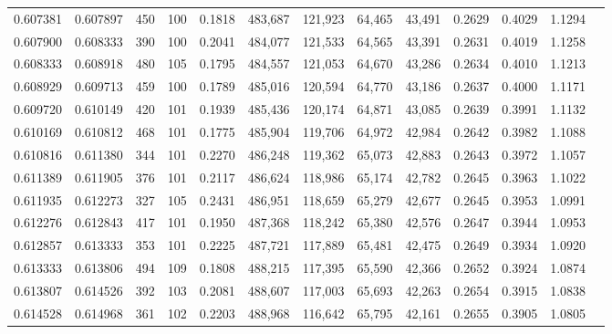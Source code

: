 \begin{tabular}{rrrrrrrrrrrrr}
0.607381 & 0.607897 &    450 &   100 &                                     0.1818 & 483,687 & 121,923 &  64,465 &  43,491 & 0.2629 & 0.4029 & 1.1294 \\
0.607900 & 0.608333 &    390 &   100 &                                     0.2041 & 484,077 & 121,533 &  64,565 &  43,391 & 0.2631 & 0.4019 & 1.1258 \\
0.608333 & 0.608918 &    480 &   105 &                                     0.1795 & 484,557 & 121,053 &  64,670 &  43,286 & 0.2634 & 0.4010 & 1.1213 \\
0.608929 & 0.609713 &    459 &   100 &                                     0.1789 & 485,016 & 120,594 &  64,770 &  43,186 & 0.2637 & 0.4000 & 1.1171 \\
0.609720 & 0.610149 &    420 &   101 &                                     0.1939 & 485,436 & 120,174 &  64,871 &  43,085 & 0.2639 & 0.3991 & 1.1132 \\
0.610169 & 0.610812 &    468 &   101 &                                     0.1775 & 485,904 & 119,706 &  64,972 &  42,984 & 0.2642 & 0.3982 & 1.1088 \\
0.610816 & 0.611380 &    344 &   101 &                                     0.2270 & 486,248 & 119,362 &  65,073 &  42,883 & 0.2643 & 0.3972 & 1.1057 \\
0.611389 & 0.611905 &    376 &   101 &                                     0.2117 & 486,624 & 118,986 &  65,174 &  42,782 & 0.2645 & 0.3963 & 1.1022 \\
0.611935 & 0.612273 &    327 &   105 &                                     0.2431 & 486,951 & 118,659 &  65,279 &  42,677 & 0.2645 & 0.3953 & 1.0991 \\
0.612276 & 0.612843 &    417 &   101 &                                     0.1950 & 487,368 & 118,242 &  65,380 &  42,576 & 0.2647 & 0.3944 & 1.0953 \\
0.612857 & 0.613333 &    353 &   101 &                                     0.2225 & 487,721 & 117,889 &  65,481 &  42,475 & 0.2649 & 0.3934 & 1.0920 \\
0.613333 & 0.613806 &    494 &   109 &                                     0.1808 & 488,215 & 117,395 &  65,590 &  42,366 & 0.2652 & 0.3924 & 1.0874 \\
0.613807 & 0.614526 &    392 &   103 &                                     0.2081 & 488,607 & 117,003 &  65,693 &  42,263 & 0.2654 & 0.3915 & 1.0838 \\
0.614528 & 0.614968 &    361 &   102 &                                     0.2203 & 488,968 & 116,642 &  65,795 &  42,161 & 0.2655 & 0.3905 & 1.0805 \\

\end{tabular}
